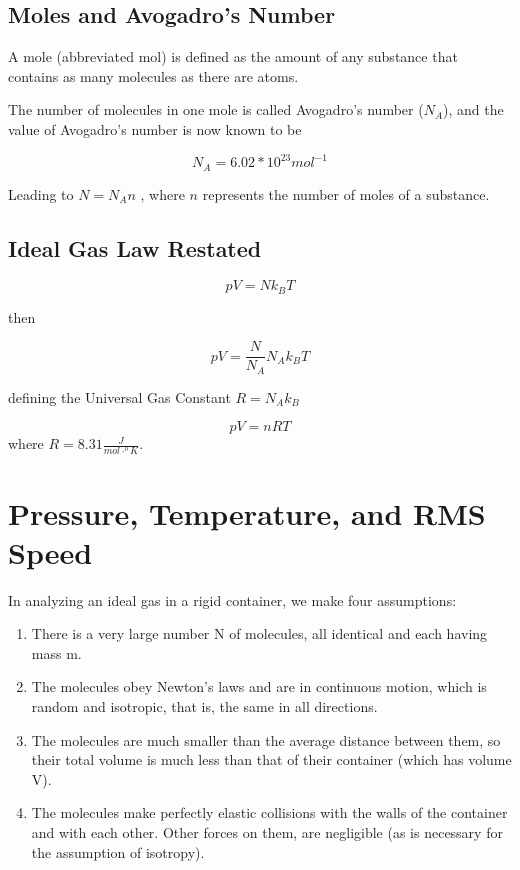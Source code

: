 \documentclass[14pt]{memoir}
\begin{document}
\subsection{Moles and Avogadro's Number}

A mole (abbreviated mol) is defined as the amount of any substance that contains as many molecules as there are atoms.

The number of molecules in one mole is called Avogadro’s number ($N_A$),  and the value of Avogadro’s number is now known to be

\begin{equation}
N_A = 6.02 * 10^{23} mol^{-1}
\end{equation}

Leading to  $N=N_A n$ , where $n$ represents the number of moles of a substance.

\subsection{Ideal Gas Law Restated}

\begin{equation}
pV = N k_B T
\end{equation}

then

\begin{equation}
pV = \frac{N}{N_A} N_A k_B T
\end{equation}

defining the Universal Gas Constant $R = N_A k_B$

\begin{equation}
pV = n R T
\end{equation}
where $R = 8.31 \frac{J}{mol \cdot ^oK}$.

\section{Pressure, Temperature, and RMS Speed}

In analyzing an ideal gas in a rigid container, we make four assumptions:

\begin{enumerate}
\item There is a very large number N of molecules, all identical and each having mass m.
\item The molecules obey Newton’s laws and are in continuous motion, which is random and isotropic, that is, the same in all directions.
\item The molecules are much smaller than the average distance between them, so their total volume is much less than that of their container (which has volume V). 
\item The molecules make perfectly elastic collisions with the walls of the container and with each other. Other forces on them, are negligible (as is necessary for the assumption of isotropy).
\end{enumerate}
\end{document}
